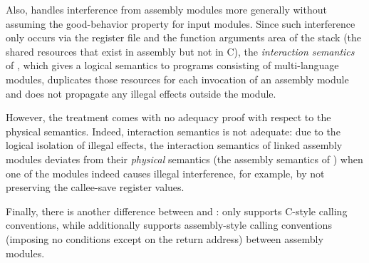 Also, \ccc{} handles interference from assembly modules more
generally without assuming the good-behavior property for input modules.
Since such interference only occurs via the register file
and the function arguments area of the stack (\ie the shared resources
that exist in assembly but not in C), the \emph{interaction semantics}
of \ccc{}, which gives a logical semantics to programs consisting of
multi-language modules, duplicates those resources for each invocation
of an assembly module and does not propagate any illegal effects
outside the module.

However, the treatment comes with no adequacy proof with respect to
the physical semantics. Indeed, interaction semantics is not
adequate: due to the logical isolation of illegal effects, the
interaction semantics of linked assembly modules deviates from their
\emph{physical} semantics (\ie the assembly semantics of \cc{}) when
one of the modules indeed causes illegal interference, for example, by not
preserving the callee-save register values.

Finally, there is another difference between \ccc{} and \ccx{}:
\ccc{} only supports C-style calling conventions, while \ccx{} additionally
supports assembly-style calling conventions (\ie imposing no conditions
except on the return address) between assembly modules.

